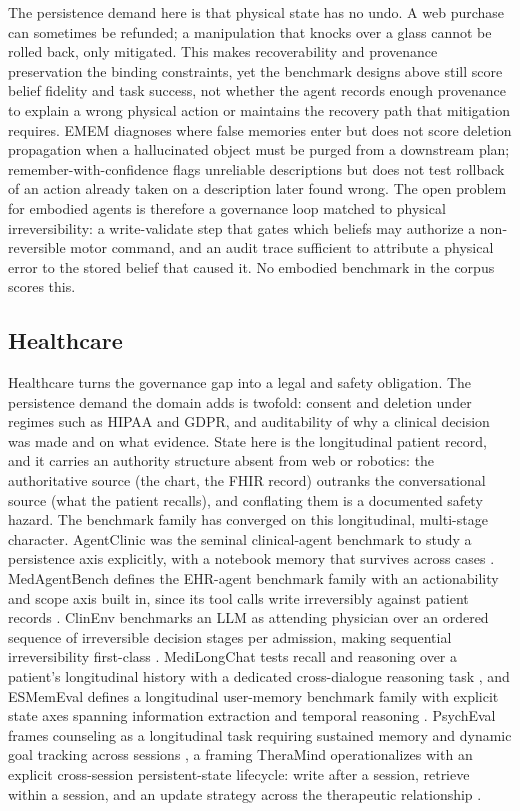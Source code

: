 The persistence demand here is that physical state has no undo. A web purchase can sometimes be refunded; a manipulation that knocks over a glass cannot be rolled back, only mitigated. This makes recoverability and provenance preservation the binding constraints, yet the benchmark designs above still score belief fidelity and task success, not whether the agent records enough provenance to explain a wrong physical action or maintains the recovery path that mitigation requires. EMEM diagnoses where false memories enter but does not score deletion propagation when a hallucinated object must be purged from a downstream plan; remember-with-confidence flags unreliable descriptions but does not test rollback of an action already taken on a description later found wrong. The open problem for embodied agents is therefore a governance loop matched to physical irreversibility: a write-validate step that gates which beliefs may authorize a non-reversible motor command, and an audit trace sufficient to attribute a physical error to the stored belief that caused it. No embodied benchmark in the corpus scores this.

\subsection{Healthcare}

Healthcare turns the governance gap into a legal and safety obligation. The persistence demand the domain adds is twofold: consent and deletion under regimes such as HIPAA and GDPR, and auditability of why a clinical decision was made and on what evidence. State here is the longitudinal patient record, and it carries an authority structure absent from web or robotics: the authoritative source (the chart, the FHIR record) outranks the conversational source (what the patient recalls), and conflating them is a documented safety hazard. The benchmark family has converged on this longitudinal, multi-stage character. AgentClinic was the seminal clinical-agent benchmark to study a persistence axis explicitly, with a notebook memory that survives across cases \citep{schmidgall2024agentclinic}. MedAgentBench defines the EHR-agent benchmark family with an actionability and scope axis built in, since its tool calls write irreversibly against patient records \citep{jiang2025medagentbench}. ClinEnv benchmarks an LLM as attending physician over an ordered sequence of irreversible decision stages per admission, making sequential irreversibility first-class \citep{lu2026clinenv}. MediLongChat tests recall and reasoning over a patient's longitudinal history with a dedicated cross-dialogue reasoning task \citep{hu2026medilongchat}, and ESMemEval defines a longitudinal user-memory benchmark family with explicit state axes spanning information extraction and temporal reasoning \citep{chen2026esmemeval}. PsychEval frames counseling as a longitudinal task requiring sustained memory and dynamic goal tracking across sessions \citep{pan2026psycheval}, a framing TheraMind operationalizes with an explicit cross-session persistent-state lifecycle: write after a session, retrieve within a session, and an update strategy across the therapeutic relationship \citep{hu2025theramind}.

